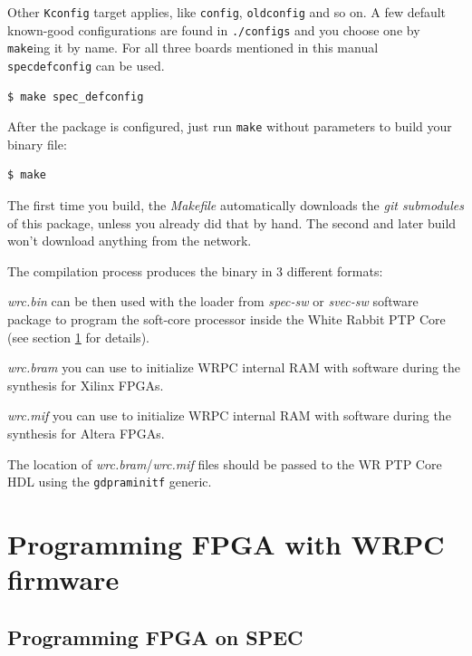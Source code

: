 \documentclass[a4paper, 12pt]{article}
\renewcommand{\_}{\underscore\allowbreak}
\newcommand{\code}[1]{\texttt{#1}}
\begin{document}
Other \code{Kconfig} target applies, like \code{config}, \code{oldconfig}
and so on. A few default known-good configurations are found in
\texttt{./configs} and you choose one by \code{make}ing it by name. For all
three boards mentioned in this manual \code{spec\_defconfig} can be used.
\begin{lstlisting}
$ make spec_defconfig
\end{lstlisting}

After the package is configured, just run \code{make} without parameters to
build your binary file:
\begin{lstlisting}
$ make
\end{lstlisting}

The first time you build, the \textit{Makefile} automatically downloads
the \textit{git submodules} of this package, unless you already did that
by hand. The second and later build won't download anything
from the network.

The compilation process produces the binary in 3 different formats:
\begin{itemize*}
  \item \textit{wrc.bin} can be then used with the loader from \textit{spec-sw}
    or \textit{svec-sw} software package to program the soft-core processor
    inside the White
    Rabbit PTP Core (see section \ref{Programming FPGA} for details).
  \item \textit{wrc.bram} you can use to initialize WRPC internal RAM with
    software during the synthesis for Xilinx FPGAs.
  \item \textit{wrc.mif} you can use to initialize WRPC internal RAM with
    software during the synthesis for Altera FPGAs.
\end{itemize*}
The location of \textit{wrc.bram}/\textit{wrc.mif} files should be passed to the
WR PTP Core HDL using the \texttt{g\_dpram\_initf} generic.

\newpage
\section{Programming FPGA with WRPC firmware}
\label{Programming FPGA}

\subsection{Programming FPGA on SPEC}
\label{Programming FPGA on SPEC}
\end{document}
